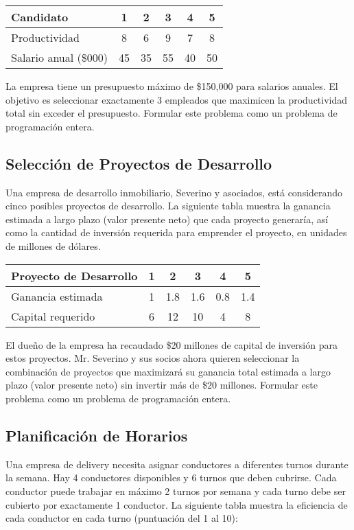 \documentclass[12pt]{article}
\begin{document}
\begin{table}[h]
\centering
\begin{tabular}{lccccc}
\toprule
\textbf{Candidato} & 1 & 2 & 3 & 4 & 5 \\
\midrule
Productividad & 8 & 6 & 9 & 7 & 8 \\
Salario anual (\$000) & 45 & 35 & 55 & 40 & 50 \\
\bottomrule
\end{tabular}
\end{table}

La empresa tiene un presupuesto máximo de \$150,000 para salarios anuales. El objetivo es seleccionar exactamente 3 empleados que maximicen la productividad total sin exceder el presupuesto. Formular este problema como un problema de programación entera.

\subsection{Selección de Proyectos de Desarrollo}
Una empresa de desarrollo inmobiliario, Severino y asociados, está considerando cinco posibles proyectos de desarrollo. La siguiente tabla muestra la ganancia estimada a largo plazo (valor presente neto) que cada proyecto generaría, así como la cantidad de inversión requerida para emprender el proyecto, en unidades de millones de dólares.

\begin{table}[H]
\centering
\begin{tabular}{lccccc}
\toprule
\textbf{Proyecto de Desarrollo} & 1 & 2 & 3 & 4 & 5 \\
\midrule
Ganancia estimada & 1 & 1.8 & 1.6 & 0.8 & 1.4 \\
Capital requerido & 6 & 12 & 10 & 4 & 8 \\
\bottomrule
\end{tabular}
\end{table}

El dueño de la empresa ha recaudado \$20 millones de capital de inversión para estos proyectos. Mr. Severino y sus socios ahora quieren seleccionar la combinación de proyectos que maximizará su ganancia total estimada a largo plazo (valor presente neto) sin invertir más de \$20 millones. Formular este problema como un problema de programación entera.

\subsection{Planificación de Horarios}
Una empresa de delivery necesita asignar conductores a diferentes turnos durante la semana. Hay 4 conductores disponibles y 6 turnos que deben cubrirse. Cada conductor puede trabajar en máximo 2 turnos por semana y cada turno debe ser cubierto por exactamente 1 conductor. La siguiente tabla muestra la eficiencia de cada conductor en cada turno (puntuación del 1 al 10):
\end{document}
